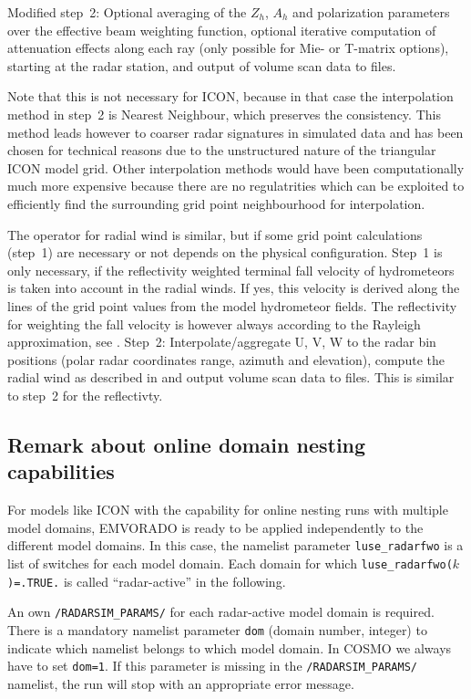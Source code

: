 \documentclass[10pt,a4paper,twoside,headinclude,footinclude,parskip=half]{scrartcl}
\newcommand{\myaktuellesection}{sec:intro}%
\newcommand{\labelsec}[1]{\label{#1}\renewcommand{\myaktuellesection}{#1}}%
\newcommand{\labelsec}[1]{\label{#1}}%
\newcommand{\citeP}[1]{\citet{#1}}
\newcommand{\srcform}[1]{\mbox{\texttt{#1}}\xspace}%
\begin{document}
Modified step~2: Optional averaging of the $Z_h$, $A_h$ and polarization parameters over the effective beam weighting function, optional iterative computation
of attenuation effects along each ray (only possible for Mie- or T-matrix options), starting at the radar station, and output of volume
scan data to files.

Note that this is not necessary for ICON, because in that case the interpolation method in step~2 is Nearest Neighbour, which preserves the consistency.
This method leads however to coarser radar signatures in simulated data and has been chosen for technical reasons due to the unstructured nature of the triangular ICON model grid. Other interpolation methods
would have been computationally much more expensive because there are no regulatrities which can be exploited to efficiently find the
surrounding grid point neighbourhood for interpolation.

The operator for radial wind is similar, but if some grid point calculations (step~1) are necessary or not
depends on the physical configuration. Step~1 is only necessary, if the reflectivity weighted terminal fall velocity
of hydrometeors is taken into account in the radial winds. If yes, this velocity is derived along the
lines of the grid point values from the model hydrometeor fields. The reflectivity for weighting the 
fall velocity is however always according to the Rayleigh approximation, see \citeP{zeng2016a}.
Step~2: Interpolate/aggregate U, V, W to the radar bin positions (polar radar coordinates
range, azimuth and elevation), compute the radial wind as described in \citeP{zeng2016a} and
output volume scan data to files. This is similar to step~2 for the reflectivty.


\subsection{Remark about online domain nesting capabilities}

\labelsec{sec:intro:idom}

For models like ICON with the capability for online nesting runs with multiple model domains, EMVORADO
is ready to be applied independently to the different model domains.
In this case, the namelist parameter \srcform{luse_radarfwo} is a list of switches for each
model domain. Each domain for which \srcform{luse_radarfwo($k$)=.TRUE.} is called ``radar-active'' in the following.

An own \srcform{/RADARSIM_PARAMS/} for each radar-active model domain is required.
There is a mandatory namelist parameter \srcform{dom} (domain number, integer) to indicate
which namelist belongs to which model domain. In COSMO we always have to set \srcform{dom=1}.
If this parameter is missing in the \srcform{/RADARSIM_PARAMS/} namelist, the run will stop with an
appropriate error message.
\end{document}
